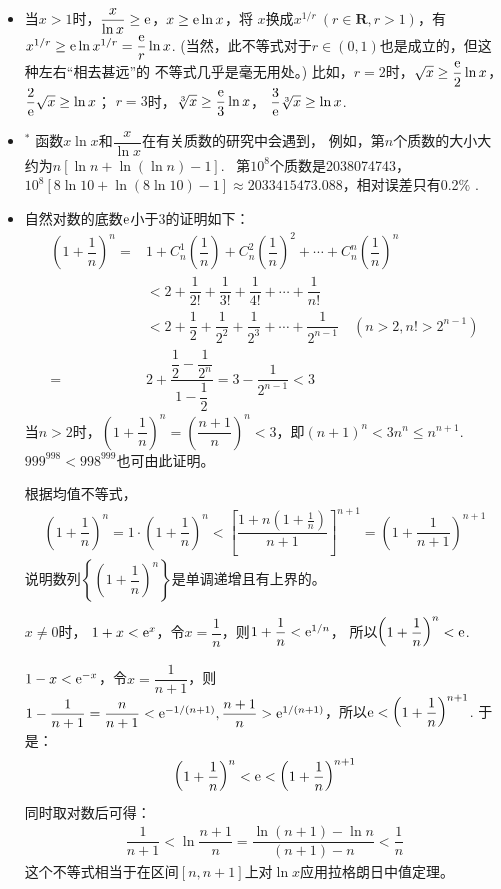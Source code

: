 \begin{itemize}[leftmargin=\inteval{\myitemleftmargin}pt,itemsep=
   \inteval{\myitemitempsep}pt,topsep=\inteval{\myitemtopsep}pt]
\item 当$ x>1 $时，$ \dfrac{x}{\ln x}\geq \mathrm{e} $，$ x\geq \mathrm{e}\ln x $，将
$ x $换成$ x^{1/r}\ (r\in \textbf{R},r>1) $，有
$ x^{1/r}\geq \mathrm{e}\ln x^{1/r}=\dfrac{\mathrm{e}}{r}\ln x $.
(当然，此不等式对于$ r\in(0,1) $也是成立的，但这种左右“相去甚远”的
不等式几乎是毫无用处。)
比如，$ r=2 $时，$ \sqrt{x}\geq \dfrac{\mathrm{e}}{2}\ln x $，
$ \dfrac{2}{\mathrm{e}}\sqrt{x}\geq \ln x $；
$ r=3 $时，$ \sqrt[3]{x}\geq \dfrac{\mathrm{e}}{3}\ln x $，
$ \dfrac{3}{\mathrm{e}}\sqrt[3]{x}\geq \ln x $.

\item $^*$ 函数$ x\ln x $和$ \dfrac{x}{\ln x} $在有关质数的研究中会遇到，
例如，第$ n $个质数的大小大约为$ n[\ln n+\ln(\ln n)-1] $.
\ 第$ 10^8 $个质数是2038074743，
$ 10^8[8\ln 10+\ln(8\ln 10)-1]\approx 2033415473.088 $，相对误差只有0.2$ \% $ .

\item 自然对数的底数$ \mathrm{e} $小于3的证明如下：
\begin{align}
    \left( 1+\dfrac{1}{n}\right)^n =&1+C_n^1\left(\dfrac{1}{n}\right)+
    C_n^2\left(\dfrac{1}{n}\right)^2+\cdots +C_n^n\left(\dfrac{1}{n}\right)^n \nonumber \\
    &<2+\dfrac{1}{2!}+\dfrac{1}{3!}+\dfrac{1}{4!}+\cdots +\dfrac{1}{n!} \nonumber\\
    &<2+\dfrac{1}{2}+\dfrac{1}{2^2}+\dfrac{1}{2^3}+\cdots +\dfrac{1}{2^{n-1}} \quad (n>2,n!>2^{n-1}) \nonumber \\
    =&2+\dfrac{\dfrac{1}{2}-\dfrac{1}{2^n}}{1-\dfrac{1}{2}}=3-\dfrac{1}{2^{n-1}}<3 \label{e小于3的证明}
\end{align}
当$ n>2 $时，$ \left( 1+\dfrac{1}{n}\right)^n =\left(\dfrac{n+1}{n} \right)^n <3  $，即$ 
(n+1)^n<3n^n\leq n^{n+1} $.\ $ 999^{998} < 998^{999} $也可由此证明。

根据均值不等式，
\begin{align*}
    \left( 1+\dfrac{1}{n}\right)^n=1\cdot \left( 1+\dfrac{1}{n}\right)^n 
    <\left[\dfrac{1+n\left(1+\frac{1}{n}\right)}{n+1} \right]^{n+1}
    =\left( 1+\dfrac{1}{n+1}\right)^{n+1}
\end{align*}
说明数列$ \left\{ \left( 1+\dfrac{1}{n}\right)^n \right\}  $是单调递增且有上界的。

$ x\neq 0 $时，
$ 1+x<\mathrm{e}^x $，令$ x=\dfrac{1}{n} $，则$ 1+\dfrac{1}{n}<\mathrm{e}^{1/n} $，
所以$\left( 1+\dfrac{1}{n}\right)^n<\mathrm{e} $.

$ 1-x<\mathrm{e}^{-x} $，令$ x=\dfrac{1}{n+1} $，则$ 1-\dfrac{1}{n+1}=\dfrac{n}{n+1}<\mathrm{e}^{-1/(n+1)},
\dfrac{n+1}{n}>\mathrm{e}^{1/(n+1)} $，所以$ \mathrm{e} < \left( 1+\dfrac{1}{n}\right)^{n+1} $.
于是：
\begin{align}\label{e的两边夹不等式}
    \left( 1+\dfrac{1}{n}\right)^{n} < \mathrm{e} < \left( 1+\dfrac{1}{n}\right)^{n+1}
\end{align}
同时取对数后可得：
\begin{align*}
    \dfrac{1}{n+1} < \ln \dfrac{n+1}{n}=\dfrac{\ln (n+1)-\ln n}{(n+1)-n} < \dfrac{1}{n}
\end{align*}
这个不等式相当于在区间$ [n,n+1] $上对$ \ln x $应用拉格朗日中值定理。


\end{itemize}
